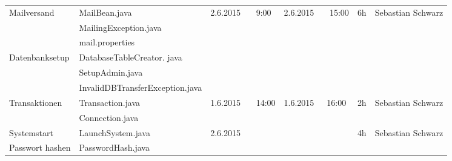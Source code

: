 \begin{landscape}
\begin{tabular}{|p{6cm} |p{6cm}|p{3cm}|p{3cm}|p{2cm}|p{3.5cm}|}
	\hline  Mailversand          & MailBean.java                              & 2.6.2015 \ \ \ 9:00        & 2.6.2015 \ \ \ 15:00        & 6h                 & Sebastian Schwarz\\ 	
	& MailingException.java                      &                            &                            &                                                  &\\
	& mail.properties                            &                            &                            &                                                  &\\
	\hline Datenbanksetup        & DatabaseTableCreator. java                 &                            &                             &                    &\\
	& SetupAdmin.java                            &                            &                            &                                                  &\\
	& InvalidDBTransferException.java            &                            &                            &                                                  &\\
	\hline Transaktionen         & Transaction.java                           & 1.6.2015 \ \ \  14:00      & 1.6.2015\ \ \ 16:00 & 2h                         & Sebastian Schwarz\\  
	& Connection.java                            &                            &                            &                                                  &\\  
	\hline Systemstart           & LaunchSystem.java                          & 2.6.2015 \ \ \             &                             & 4h                 & Sebastian Schwarz\\
	\hline Passwort hashen       & PasswordHash.java                          &                            &                             &                    &\\       	   
	\hline 
\end{tabular} \ \\
\ \\


\end{landscape}
